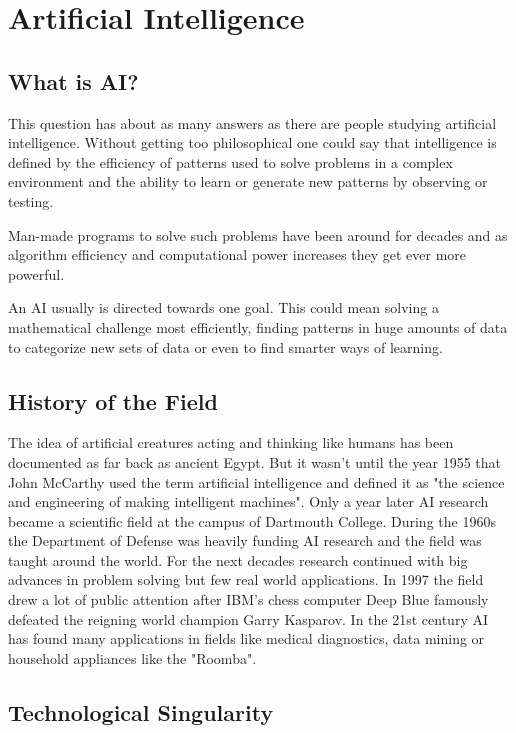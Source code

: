 \chapter{Artificial Intelligence}
\section{What is AI?}

This question has about as many answers as there are people studying artificial intelligence. Without getting too philosophical one could say that intelligence is defined by the efficiency of patterns used to solve problems in a complex environment and the ability to learn or generate new patterns by observing or testing.

Man-made programs to solve such problems have been around for decades and as algorithm efficiency and computational power increases they get ever more powerful.

An AI usually is directed towards one goal. This could mean solving a mathematical challenge most efficiently, finding patterns in huge amounts of data to categorize new sets of data or even to find smarter ways of learning.


\section{History of the Field}

The idea of artificial creatures acting and thinking like humans has been documented as far back as ancient Egypt. But it wasn't until the year 1955 that John McCarthy used the term artificial intelligence and defined it as "the science and engineering of making intelligent machines".
Only a year later AI research became a scientific field at the campus of Dartmouth College. During the 1960s the Department of Defense was heavily funding AI research and the field was taught around the world.
For the next decades research continued with big advances in problem solving but few real world applications. In 1997 the field drew a lot of public attention after IBM's chess computer Deep Blue famously defeated the reigning world champion Garry Kasparov.
In the 21st century AI has found many applications in fields like medical diagnostics, data mining or household appliances like the "Roomba". 

\section{Technological Singularity}

